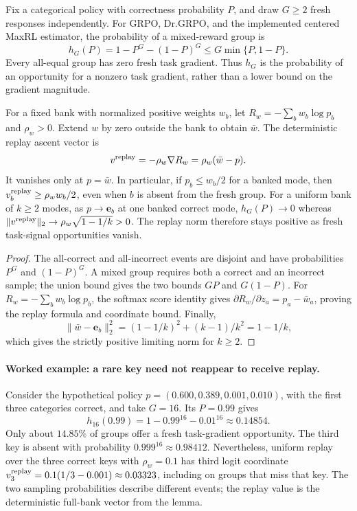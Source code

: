 \begin{lemma}
\label{lem:replay-gradient-availability}
Fix a categorical policy with correctness probability $P$, and draw $G\ge2$
fresh responses independently. For GRPO, Dr.GRPO, and the implemented centered
MaxRL estimator, the probability of a mixed-reward group is
\[
 h_G(P)=1-P^G-(1-P)^G\le G\min\{P,1-P\}.
\]
Every all-equal group has zero fresh task gradient. Thus $h_G$ is the
probability of an opportunity for a nonzero task gradient, rather than a
lower bound on the gradient magnitude.

For a fixed bank with normalized positive weights $w_b$, let
$R_w=-\sum_b w_b\log p_b$ and $\rho_w>0$. Extend $w$ by zero outside the
bank to obtain $\bar w$. The deterministic replay ascent vector is
\[
 v^{\rm replay}=-\rho_w\nabla R_w=\rho_w(\bar w-p).
\]
It vanishes only at $p=\bar w$. In particular, if $p_b\le w_b/2$ for a banked
mode, then $v^{\rm replay}_b\ge\rho_w w_b/2$, even when $b$ is absent from the
fresh group. For a uniform bank of $k\ge2$ modes, as $p\to\mathbf e_b$ at
one banked correct mode, $h_G(P)\to0$ whereas
$\|v^{\rm replay}\|_2\to\rho_w\sqrt{1-1/k}>0$.
The replay norm therefore stays positive as fresh task-signal opportunities vanish.
\end{lemma}

\begin{proof}
The all-correct and all-incorrect events are disjoint and have probabilities
$P^G$ and $(1-P)^G$. A mixed group requires both a correct and an incorrect
sample; the union bound gives the two bounds $GP$ and $G(1-P)$.
For $R_w=-\sum_b w_b\log p_b$, the softmax score identity gives
$\partial R_w/\partial z_a=p_a-\bar w_a$, proving the replay formula and
coordinate bound. Finally,
\[
 \|\bar w-\mathbf e_b\|_2^2=(1-1/k)^2+(k-1)/k^2=1-1/k,
\]
which gives the strictly positive limiting norm for $k\ge2$.
\end{proof}

\paragraph{Worked example: a rare key need not reappear to receive replay.}
Consider the hypothetical policy $p=(0.600,0.389,0.001,0.010)$, with the
first three categories correct, and take $G=16$. Its $P=0.99$ gives
\[
 h_{16}(0.99)=1-0.99^{16}-0.01^{16}\approx0.14854.
\]
Only about $14.85\%$ of groups offer a fresh task-gradient opportunity.
The third key is absent with probability $0.999^{16}\approx0.98412$.
Nevertheless, uniform replay over the three correct keys with $\rho_w=0.1$
has third logit coordinate
$v^{\rm replay}_3=0.1(1/3-0.001)\approx0.03323$, including on groups that
miss that key. The two sampling probabilities describe different events;
the replay value is the deterministic full-bank vector from the lemma.

